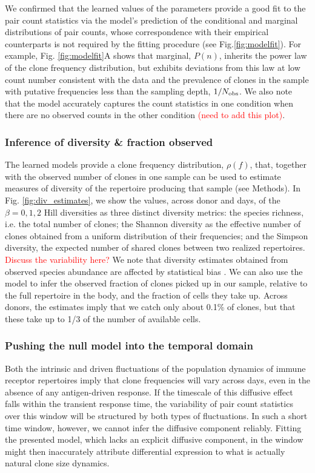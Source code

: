 \documentclass[letterpaper,english,prl,reprint,longbibliography]{revtex4-1} %
\begin{document}
We confirmed that the learned values of the parameters provide a good fit to the pair count statistics via the model's prediction of the conditional and marginal distributions of pair counts, whose correspondence with their empirical counterparts is not required by the fitting procedure (see Fig.\ref{fig:modelfit}). For example, Fig. \ref{fig:modelfit}A shows that marginal, $P(n)$, inherits the power law of the clone frequency distribution, but exhibits deviations from this law at low count number consistent with the data and the prevalence of clones in the sample with putative frequencies less than the sampling depth, $1/N_{\textrm{\textrm{obs}}}$. We also note that the model accurately captures the count statistics in one condition when there are no observed counts in the other condition \textcolor{red}{(need to add this plot)}.

\subsubsection*{Inference of diversity \& fraction observed}
The learned models provide a clone frequency distribution, $\rho(f)$, that, together with the observed number of clones in one sample can be used to estimate measures of diversity of the repertoire producing that sample (see Methods). In Fig. \ref{fig:div_estimates}, we show the values, across donor and days, of the $\beta=0,1,2$ Hill diversities as three distinct diversity metrics: the species richness, i.e. the total number of clones; the Shannon diversity as the effective number of clones obtained from a uniform distribution of their frequencies; and the Simpson diversity, the expected number of shared clones between two realized repertoires. \textcolor{red}{Discuss the variability here?} We note that diversity estimates obtained from observed species abundance are affected by statistical bias \citep{Mora2016}.
We can also use the model to infer the observed fraction of clones picked up in our sample, relative to the full repertoire in the body, and the fraction of cells they take up. Across donors, the estimates imply that we catch only about 0.1\% of clones, but that these take up to 1/3 of the number of available cells.

\subsubsection*{Pushing the null model into the temporal domain}
Both the intrinsic and driven fluctuations of the population dynamics of immune receptor repertoires imply that clone frequencies will vary across days, even in the absence of any antigen-driven response. 
If the timescale of this diffusive effect falls within the transient response time, the variability of pair count statistics over this window will be structured by both types of fluctuations. 
In such a short time window, however, we cannot infer the diffusive component reliably. 
Fitting the presented model, which lacks an explicit diffusive component, in the window might then inaccurately attribute differential expression to what is actually natural clone size dynamics. 
\end{document}
